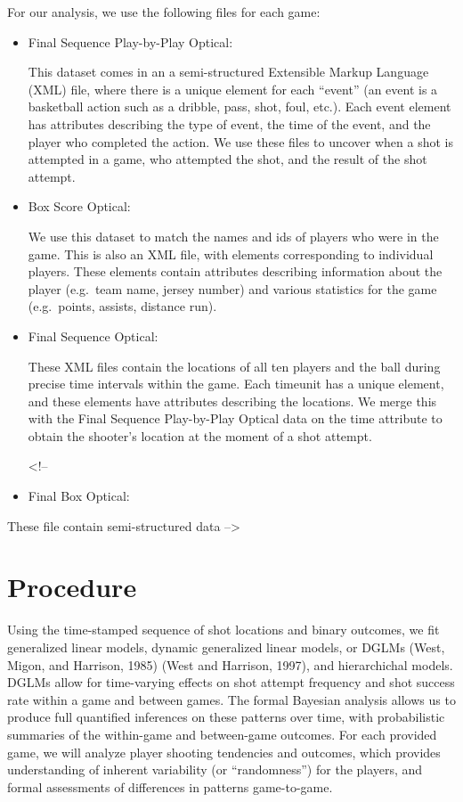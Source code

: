 \documentclass[12pt,twoside]{dukestatscithesis}
\theoremstyle{definition}
\theoremstyle{definition}
\theoremstyle{definition}
\theoremstyle{remark}
\begin{document}
For our analysis, we use the following files for each game:
\begin{itemize}
\item
  Final Sequence Play-by-Play Optical:

  This dataset comes in an a semi-structured Extensible Markup Language
  (XML) file, where there is a unique element for each ``event'' (an
  event is a basketball action such as a dribble, pass, shot, foul,
  etc.). Each event element has attributes describing the type of event,
  the time of the event, and the player who completed the action. We use
  these files to uncover when a shot is attempted in a game, who
  attempted the shot, and the result of the shot attempt.
\item
  Box Score Optical:

  We use this dataset to match the names and ids of players who were in
  the game. This is also an XML file, with elements corresponding to
  individual players. These elements contain attributes describing
  information about the player (e.g.~team name, jersey number) and
  various statistics for the game (e.g.~points, assists, distance run).
\item
  Final Sequence Optical:

  These XML files contain the locations of all ten players and the ball
  during precise time intervals within the game. Each timeunit has a
  unique element, and these elements have attributes describing the
  locations. We merge this with the Final Sequence Play-by-Play Optical
  data on the time attribute to obtain the shooter's location at the
  moment of a shot attempt.

  \textless{}!--
\item
  Final Box Optical:
\end{itemize}
These file contain semi-structured data --\textgreater{}

\chapter{Procedure}\label{proc}

Using the time-stamped sequence of shot locations and binary outcomes,
we fit generalized linear models, dynamic generalized linear models, or
DGLMs (West, Migon, and Harrison, 1985) (West and Harrison, 1997), and
hierarchichal models. DGLMs allow for time-varying effects on shot
attempt frequency and shot success rate within a game and between games.
The formal Bayesian analysis allows us to produce full quantified
inferences on these patterns over time, with probabilistic summaries of
the within-game and between-game outcomes. For each provided game, we
will analyze player shooting tendencies and outcomes, which provides
understanding of inherent variability (or ``randomness'') for the
players, and formal assessments of differences in patterns game-to-game.
\end{document}

